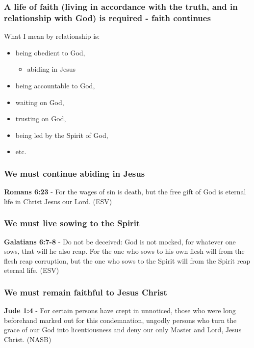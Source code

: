 \documentclass[11pt]{article}
\begin{document}
\subsubsection{A life of faith (living in accordance with the truth, and in relationship with God) is required - faith continues}
\label{sec:org9380b07}
What I mean by relationship is:
\begin{itemize}
\item being obedient to God,
\begin{itemize}
\item abiding in Jesus
\end{itemize}
\item being accountable to God,
\item waiting on God,
\item trusting on God,
\item being led by the Spirit of God,
\item etc.
\end{itemize}

\subsubsection{We must continue abiding in Jesus}
\label{sec:org8c739f4}

\textbf{Romans 6:23} - For the wages of sin is death, but the free gift of God is eternal life in Christ Jesus our Lord. (ESV)

\subsubsection{We must live sowing to the Spirit}
\label{sec:orgce21e2a}

\textbf{Galatians 6:7-8} - Do not be deceived: God is not mocked, for whatever one sows, that will he also reap. For the one who sows to his own flesh will from the flesh reap corruption, but the one who sows to the Spirit will from the Spirit reap eternal life. (ESV)

\subsubsection{We must remain faithful to Jesus Christ}
\label{sec:orgaf256f0}

\textbf{Jude 1:4} - For certain persons have crept in unnoticed, those who were long beforehand marked out for this condemnation, ungodly persons who turn the grace of our God into licentiousness and deny our only Master and Lord, Jesus Christ. (NASB)
\end{document}
